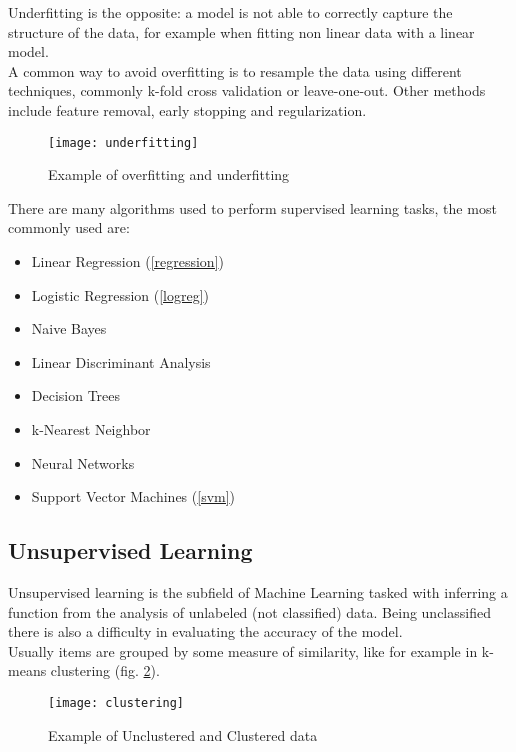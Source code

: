 \begin{itemize}
	Underfitting is the opposite: a model is not able to correctly capture the structure of the data, for example when fitting non linear data with a linear model. \\
	A common way to avoid overfitting is to resample the data using different techniques, commonly k-fold cross validation or leave-one-out. Other methods include feature removal, early stopping and regularization.
	
	\begin{figure}[H]
		\centering
		\texttt{[image: underfitting]}
		\caption{Example of overfitting and underfitting \cite{underfitting}}
		\label{fig:underfitting}
	\end{figure}
\end{itemize}

There are many algorithms used to perform supervised learning tasks, the most commonly used are:

\begin{itemize}[noitemsep, topsep = -5pt]
	\item Linear Regression (\ref{regression})
	\item Logistic Regression (\ref{logreg})
	\item Naive Bayes
	\item Linear Discriminant Analysis
	\item Decision Trees
	\item k-Nearest Neighbor
	\item Neural Networks
	\item Support Vector Machines (\ref{svm})
\end{itemize}

\subsection{Unsupervised Learning} \label{unsupervised}
Unsupervised learning is the subfield of Machine Learning tasked with inferring a function from the analysis of unlabeled (not classified) data. Being unclassified there is also a difficulty in evaluating the accuracy of the model.\\
Usually items are grouped by some measure of similarity, like for example in k-means clustering (fig. \ref{fig:clustering}).

\begin{figure}[H]
	\centering
	\texttt{[image: clustering]}
	\caption{Example of Unclustered and Clustered data \cite{kmeans}}
	\label{fig:clustering}
\end{figure}	


